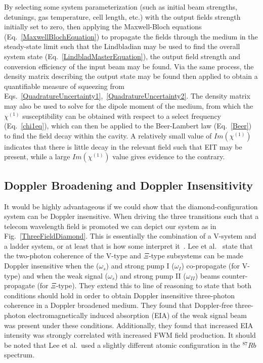 \documentclass[aps,pra,showpacs,amsmath,amssymb,nofootinbib,longbibliography,superscriptaddress
]{revtex4-1}
\theoremstyle{definition}
\theoremstyle{remark}
\newcommand{\0}{\hat{0}}
\begin{document}
By selecting some system parameterization (such as initial beam strengths, detunings, gas temperature, cell length, etc.) with the output fields strength initially set to zero, then applying the Maxwell-Bloch equations (Eq.~\eqref{MaxwellBlochEquation}) to propagate the fields through the medium in the steady-state limit such that the Lindbladian may be used to find the overall system state (Eq.~\eqref{LindbladMasterEquation}), the output field strength and conversion efficiency of the input beam may be found. Via the same process, the density matrix describing the output state may be found then applied to obtain a quantifiable measure of squeezing from Eqs.~\eqref{QuadratureUncertainty1},~\eqref{QuadratureUncertainty2}. The density matrix may also be used to solve for the dipole moment of the medium, from which the $\chi^{(1)}$ susceptibility can be obtained with respect to a select frequency (Eq.~\eqref{chi1eq}), which can then be applied to the Beer-Lambert law (Eq.~\eqref{Beer}) to find the field decay within the cavity. A relatively small value of $Im\left(\chi^{(1)}\right)$ indicates that there is little decay in the relevant field such that EIT may be present, while a large $Im\left(\chi^{(1)}\right)$ value gives evidence to the contrary.



\subsection{Doppler Broadening and Doppler Insensitivity}

It would be highly advantageous if we could show that the diamond-configuration system can be Doppler insensitive. When driving the three transitions such that a telecom wavelength field is promoted we can depict our system as in Fig.~\ref{ThreeFieldDiamond}. This is essentially the combination of a V-system and a ladder system, or at least that is how some interpret it~\cite{Lee}. Lee et al.~\cite{Lee} state that the two-photon coherence of the V-type and $\Xi$-type subsystems can be made Doppler insensitive when the ($\omega_s$) and strong pump I ($\omega_{I}$) co-propagate (for V-type) and when the weak signal ($\omega_s$) and strong pump II ($\omega_{II}$) beams counter-propagate (for $\Xi$-type). They extend this to line of reasoning to state that both conditions should hold in order to obtain Doppler insensitive three-photon coherence in a Doppler broadened medium. They found that  Doppler-free three-photon electromagnetically induced absorption (EIA) of the weak signal beam was present under these conditions. Additionally, they found that increased EIA intensity was strongly correlated with increased FWM field production. It should be noted that Lee et al.~used a slightly different atomic configuration in the $^{87}Rb$ spectrum.
\end{document}
